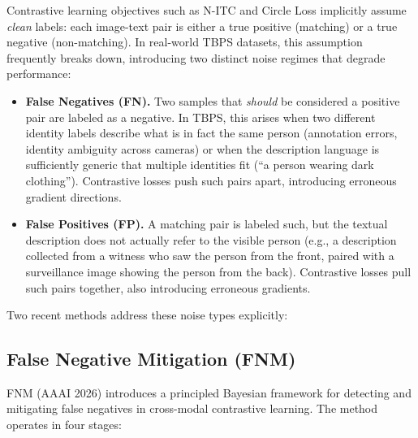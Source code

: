 \documentclass[../main.tex]{subfiles}
\begin{document}
\noindent Contrastive learning objectives such as N-ITC and Circle Loss implicitly assume \textit{clean} labels: each image-text pair is either a true positive (matching) or a true negative (non-matching). In real-world TBPS datasets, this assumption frequently breaks down, introducing two distinct noise regimes that degrade performance:

\begin{itemize}
    \item \textbf{False Negatives (FN).} Two samples that \textit{should} be considered a positive pair are labeled as a negative. In TBPS, this arises when two different identity labels describe what is in fact the same person (annotation errors, identity ambiguity across cameras) or when the description language is sufficiently generic that multiple identities fit (``a person wearing dark clothing''). Contrastive losses push such pairs apart, introducing erroneous gradient directions.
    \item \textbf{False Positives (FP).} A matching pair is labeled such, but the textual description does not actually refer to the visible person (e.g., a description collected from a witness who saw the person from the front, paired with a surveillance image showing the person from the back). Contrastive losses pull such pairs together, also introducing erroneous gradients.
\end{itemize}

\noindent Two recent methods address these noise types explicitly:

\subsection{False Negative Mitigation (FNM)}

\noindent FNM (AAAI 2026) introduces a principled Bayesian framework for detecting and mitigating false negatives in cross-modal contrastive learning. The method operates in four stages:
\end{document}
